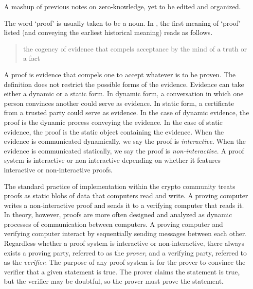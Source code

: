 
\begin{note}
    A mashup of previous notes on zero-knowledge, yet to be edited and organized.
\end{note}

The word `proof' is usually taken to be a noun.
In , the first meaning of `proof' listed (and conveying the earliest historical meaning) reads as follows.
\begin{quote}
    the cogency of evidence that compels acceptance by the mind of a truth or a fact
\end{quote}
A proof is evidence that compels one to accept whatever is to be proven.
The definition does not restrict the possible forms of the evidence. 
Evidence can take either a dynamic or a static form.
In dynamic form, a conversation in which one person convinces another could serve as evidence.
In static form, a certificate from a trusted party could serve as evidence.
In the case of dynamic evidence, the proof is the dynamic process conveying the evidence.
In the case of static evidence, the proof is the static object containing the evidence.
When the evidence is communicated dynamically, we say the proof is \emph{interactive}.
When the evidence is communicated statically, we say the proof is \emph{non-interactive}.
A proof system is interactive or non-interactive depending on whether it features interactive or non-interactive proofs.

The standard practice of implementation within the crypto community treats proofs as static blobs of data that computers read and write.
A proving computer writes a non-interactive proof and sends it to a verifying computer that reads it.
In theory, however, proofs are more often designed and analyzed as dynamic processes of communication between computers.
A proving computer and verifying computer interact by sequentially sending messages between each other.
Regardless whether a proof system is interactive or non-interactive, there always exists a proving party, referred to as the \emph{prover}, and a verifying party, referred to as the \emph{verifier}.
The purpose of any proof system is for the prover to convince the verifier that a given statement is true.
The prover claims the statement is true, but the verifier may be doubtful, so the prover must prove the statement.


